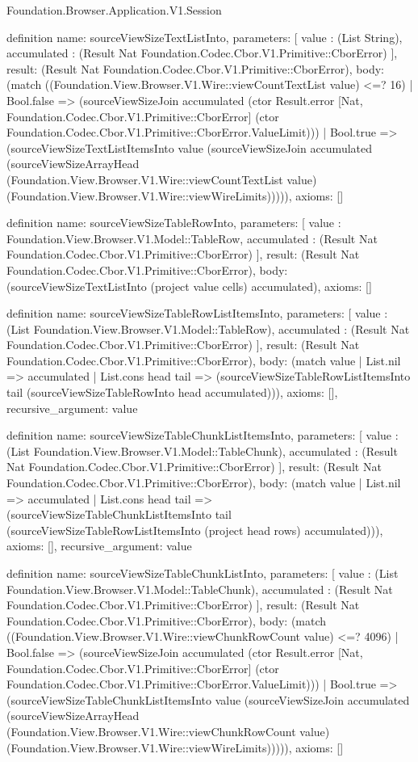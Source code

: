 \begin{lexlean}{Foundation.Browser.Application.V1.Session}
\begin{semanticmodule}
definition{
  name: sourceViewSizeTextListInto,
  parameters: [
    value : (List String),
    accumulated : (Result Nat Foundation.Codec.Cbor.V1.Primitive::CborError)
  ],
  result: (Result Nat Foundation.Codec.Cbor.V1.Primitive::CborError),
  body: (match ((Foundation.View.Browser.V1.Wire::viewCountTextList value) <=? 16)
    | Bool.false => (sourceViewSizeJoin accumulated (ctor Result.error [Nat, Foundation.Codec.Cbor.V1.Primitive::CborError] (ctor Foundation.Codec.Cbor.V1.Primitive::CborError.ValueLimit)))
    | Bool.true => (sourceViewSizeTextListItemsInto value (sourceViewSizeJoin accumulated (sourceViewSizeArrayHead (Foundation.View.Browser.V1.Wire::viewCountTextList value) (Foundation.View.Browser.V1.Wire::viewWireLimits))))),
  axioms: []
}

definition{
  name: sourceViewSizeTableRowInto,
  parameters: [
    value : Foundation.View.Browser.V1.Model::TableRow,
    accumulated : (Result Nat Foundation.Codec.Cbor.V1.Primitive::CborError)
  ],
  result: (Result Nat Foundation.Codec.Cbor.V1.Primitive::CborError),
  body: (sourceViewSizeTextListInto (project value cells) accumulated),
  axioms: []
}

definition{
  name: sourceViewSizeTableRowListItemsInto,
  parameters: [
    value : (List Foundation.View.Browser.V1.Model::TableRow),
    accumulated : (Result Nat Foundation.Codec.Cbor.V1.Primitive::CborError)
  ],
  result: (Result Nat Foundation.Codec.Cbor.V1.Primitive::CborError),
  body: (match value
    | List.nil => accumulated
    | List.cons head tail => (sourceViewSizeTableRowListItemsInto tail (sourceViewSizeTableRowInto head accumulated))),
  axioms: [],
  recursive_argument: value
}

definition{
  name: sourceViewSizeTableChunkListItemsInto,
  parameters: [
    value : (List Foundation.View.Browser.V1.Model::TableChunk),
    accumulated : (Result Nat Foundation.Codec.Cbor.V1.Primitive::CborError)
  ],
  result: (Result Nat Foundation.Codec.Cbor.V1.Primitive::CborError),
  body: (match value
    | List.nil => accumulated
    | List.cons head tail => (sourceViewSizeTableChunkListItemsInto tail (sourceViewSizeTableRowListItemsInto (project head rows) accumulated))),
  axioms: [],
  recursive_argument: value
}

definition{
  name: sourceViewSizeTableChunkListInto,
  parameters: [
    value : (List Foundation.View.Browser.V1.Model::TableChunk),
    accumulated : (Result Nat Foundation.Codec.Cbor.V1.Primitive::CborError)
  ],
  result: (Result Nat Foundation.Codec.Cbor.V1.Primitive::CborError),
  body: (match ((Foundation.View.Browser.V1.Wire::viewChunkRowCount value) <=? 4096)
    | Bool.false => (sourceViewSizeJoin accumulated (ctor Result.error [Nat, Foundation.Codec.Cbor.V1.Primitive::CborError] (ctor Foundation.Codec.Cbor.V1.Primitive::CborError.ValueLimit)))
    | Bool.true => (sourceViewSizeTableChunkListItemsInto value (sourceViewSizeJoin accumulated (sourceViewSizeArrayHead (Foundation.View.Browser.V1.Wire::viewChunkRowCount value) (Foundation.View.Browser.V1.Wire::viewWireLimits))))),
  axioms: []
}


\end{semanticmodule}
\end{lexlean}
